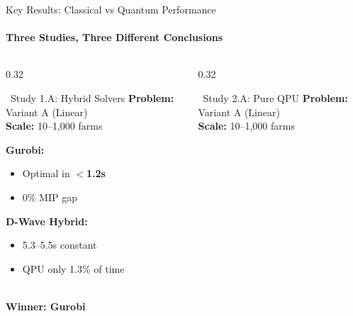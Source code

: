 \documentclass[aspectratio=169,10pt]{beamer}
\begin{document}
\begin{frame}{Key Results: Classical vs Quantum Performance}
    \framesubtitle{Three Studies, Three Different Conclusions}
    
\vspace{-0.3cm}
\begin{columns}[T]

\begin{column}{0.32\textwidth}
\begin{block}{\centering\small\faServer\ Study 1.A: Hybrid Solvers}
\vspace{0.1cm}
\textbf{\scriptsize Problem:} Variant A (Linear)\\
\textbf{\scriptsize Scale:} 10--1,000 farms

\vspace{0.15cm}
\textbf{\scriptsize Gurobi:}
\begin{itemize}\tiny
    \item[\textcolor{accentGreen}{\faCheck}] Optimal in \textbf{$<$1.2s}
    \item[\textcolor{accentGreen}{\faCheck}] 0\% MIP gap
\end{itemize}

\textbf{\scriptsize D-Wave Hybrid:}
\begin{itemize}\tiny
    \item[\textcolor{warmOrange}{\faTimes}] 5.3--5.5s constant
    \item[\textcolor{warmOrange}{\faTimes}] QPU only 1.3\% of time
\end{itemize}

\vspace{0.1cm}
\centering
\textcolor{accentGreen}{\large\faTrophy}\\
\tiny\textbf{Winner: Gurobi}
\end{block}
\end{column}

\begin{column}{0.32\textwidth}
\begin{block}{\centering\small\faMicrochip\ Study 2.A: Pure QPU}
\vspace{0.1cm}
\textbf{\scriptsize Problem:} Variant A (Linear)\\
\textbf{\scriptsize Scale:} 10--1,000 farms


\end{block}
\end{column}
\end{columns}
\end{frame}
\end{document}
